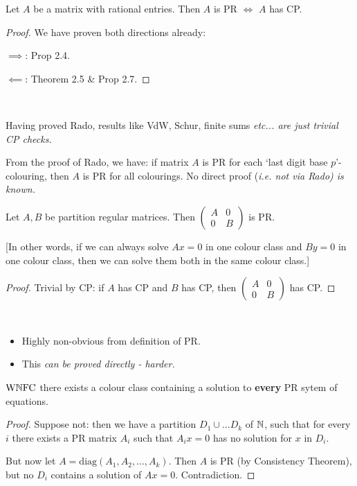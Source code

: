 \documentclass[10pt]{article}
\newcommand{\wnfc}{\textrm{W}\N\textrm{FC}}
\begin{document}
\begin{theorem}
    Let $A$ be a matrix with rational entries. Then $A$ is PR $\iff$ $A$ has CP.
\end{theorem}
\begin{proof} We have proven both directions already:

    \underline{$\implies$}: Prop 2.4.

    \underline{$\impliedby$}: Theorem 2.5 \& Prop 2.7.
\end{proof}

\begin{remark*}[Remarks]\ 
    \item Having proved Rado, results like VdW, Schur, finite sums \it{etc}... are just trivial CP checks.
    \item From the proof of Rado, we have: if matrix $A$ is PR for each `last digit base $p$'-colouring, then $A$ is PR for all colourings. No direct proof (\it{i.e.} not via Rado) is known.    
\end{remark*}

\begin{theorem}
    Let $A,B$ be partition regular matrices. Then $\left(\begin{array}{cc}A & 0\\ 0 & B\end{array}\right)$ is PR.

    [In other words, if we can always solve $Ax = 0$ in one colour class and $By = 0$ in one colour class, then we can solve them both in the same colour class.]
\end{theorem}
\begin{proof}
    Trivial by CP: if $A$ has CP and $B$ has CP, then $\left(\begin{array}{cc}A & 0\\ 0 & B\end{array}\right)$ has CP.
\end{proof}
\begin{remark*}[Remarks]\ 
    \begin{itemize}
        \item Highly non-obvious from definition of PR.
        \item This \it{can} be proved directly - harder.
    \end{itemize}
\end{remark*}

\begin{theorem}
    $\wnfc$ there exists a colour class containing a solution to \textbf{every} PR sytem of equations.
\end{theorem}
\begin{proof}
    Suppose not: then we have a partition $D_1\cup\dots D_k$ of $\mathbb{N}$, such that for every $i$ there exists a PR matrix $A_i$ such that $A_ix = 0$ has no solution for $x$ in $D_i$.

    But now let $A = \textrm{diag}(A_1,A_2,\dots,A_k)$. Then $A$ is PR (by Consistency Theorem), but no $D_i$ contains a solution of $Ax = 0$. Contradiction.
\end{proof}
\end{document}
